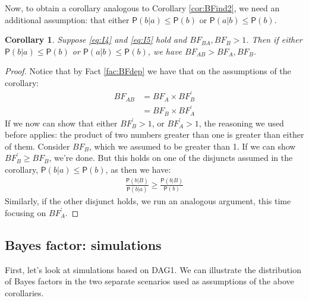 \documentclass[
  10pt,
  dvipsnames,enabledeprecatedfontcommands]{scrartcl}
\newcommand{\pr}[1]{\ensuremath{\mathsf{P}(#1)}}
\newtheorem{corollary}{Corollary}[fact]
\begin{document}
Now, to obtain a corollary analogous to Corollary \ref{cor:BFind2}, we
need an additional assumption: that either \(\pr{b\vert a} \leq \pr{b}\)
or \(\pr{a \vert b} \leq \pr{b}\).

\begin{corollary} Suppose \eqref{eq:I4} and \eqref{eq:I5}  hold and $BF_{BA}, BF_{B} >1$. 
Then if either $\pr{b\vert a} \leq \pr{b}$ or \linebreak  $\pr{a \vert b} \leq \pr{b}$, we have $BF_{AB}> BF_{A}, BF_{B}$.
\end{corollary}

\begin{proof}
Notice that by Fact \ref{fac:BFdep} we have that on the assumptions of the corollary:
\begin{align*}
BF_{AB} & = BF_{A}\times BF^{'}_{B} \\
& = BF_{B} \times BF^{'}_{A}
\end{align*}
If we now can show that either $BF^{'}_{B} > 1$, or $BF^{'}_{A} > 1$, the reasoning we used before applies: the product of two numbers greater than one is greater than either of them.  Consider $BF_{B}$, which we assumed to be greater than 1. If we can show $BF^{'}_{B}\geq BF_{B}$, we're done. But this holds on one of the disjuncts assumed in the corollary, $\pr{b\vert a} \leq \pr{b}$, as then we have:
\begin{align*}
\frac{\pr{b \vert B}}{\pr{b\vert a}} \geq \frac{\pr{b \vert B}}{\pr{b}}
\end{align*}
Similarly, if the other disjunct holds, we run an analogous argument, this time focusing on $BF^{'}_{A}$.
\end{proof}


\hypertarget{bayes-factor-simulations}{%
\subsection*{Bayes factor: simulations}\label{bayes-factor-simulations}}

First, let's look at simulations based on \textsf{DAG1}. We can
illustrate the distribution of Bayes factors in the two separate
scenarios used as assumptions of the above corollaries.

\vspace{1mm}
\footnotesize

\normalsize
\end{document}
